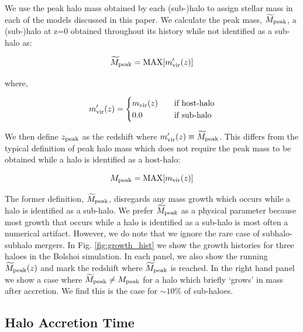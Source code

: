 \documentclass[a4paper,fleqn,usenatbib]{mnras}
\begin{document}
We use the peak halo mass obtained by each (sub-)halo to assign stellar mass in each of the models discussed in this paper.  We calculate the peak mass, $\widetilde{M}_{\rm peak}$, a (sub-)halo at z=0 obtained throughout its history while not identified as a sub-halo as:
%
\begin{linenomath}
\begin{equation}
\widetilde{M}_{\rm peak} = {\rm MAX}[m^{\prime}_{\rm vir}(z)]
\end{equation}
\end{linenomath}
%
where,
%
\begin{linenomath}
\begin{equation}
m^{\prime}_{\rm vir}(z)= 
\begin{cases}
    m_{\rm vir}(z)   & \quad \text{if host-halo}\\
    0.0                   & \quad \text{if sub-halo} \\
  \end{cases}
\end{equation}
\end{linenomath}
%
We then define $z_{\rm peak}$ as the redshift where $m^{\prime}_{\rm vir}(z)\equiv \widetilde{M}_{\rm peak}$.  This differs from the typical definition of peak halo mass which does not require the peak mass to be obtained while a halo is identified as a host-halo:
%
\begin{linenomath}
\begin{equation}
M_{\rm peak} = {\rm MAX}[m_{\rm vir}(z)]
\end{equation}
\end{linenomath}
%
The former definition, $\widetilde{M}_{\rm peak}$, disregards any mass growth which occurs while a halo is identified as a sub-halo. We prefer $\widetilde{M}_{\rm peak}$ as a physical parameter because most growth that occurs while a halo is identified as a sub-halo is most often a numerical artifact.  However, we do note that we ignore the rare case of subhalo-subhalo mergers.  In Fig. \ref{fig:growth_hist} we show the growth histories for three haloes in the Bolshoi simulation.  In each panel, we also show the running $\widetilde{M}_{\rm peak}(z)$ and mark the redshift where $\widetilde{M}_{\rm peak}$ is reached.  In the right hand panel we show a case where $\widetilde{M}_{\rm peak} \neq {M}_{\rm peak}$ for a halo which briefly `grows' in mass after accretion.  We find this is the case for $\sim 10\%$ of sub-haloes.    


\subsection{Halo Accretion Time}
\label{sec:halo_acc_time}
\end{document}
